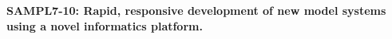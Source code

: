 \documentclass[11pt]{article}
\begin{document}
\textbf{SAMPL7-10: Rapid, responsive development of new model systems using a novel informatics platform.}

\begin{figure}
\vspace{-0.25in}
\begin{centering}


\end{centering}
\end{figure}
\end{document}
